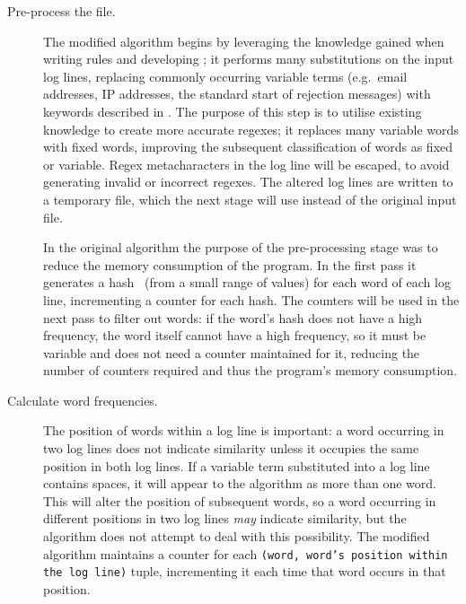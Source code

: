 \begin{description}

    \item [Pre-process the file.]  The modified algorithm begins by
        leveraging the knowledge gained when writing rules and developing
        \parsername{}; it performs many substitutions on the input log
        lines, replacing commonly occurring variable terms (e.g.\ email
        addresses, IP addresses, the standard start of rejection messages)
        with keywords described in .  The
        purpose of this step is to utilise existing knowledge to create
        more accurate regexes; it replaces many variable words with fixed
        words, improving the subsequent classification of words as fixed or
        variable.  Regex metacharacters in the log line will be escaped, to
        avoid generating invalid or incorrect regexes.  The altered log
        lines are written to a temporary file, which the next stage will
        use instead of the original input file.

        In the original algorithm the purpose of the pre-processing stage
        was to reduce the memory consumption of the program.  In the first
        pass it generates a hash~\cite{hash-functions} (from a
        small range of values) for each word of each log line, incrementing
        a counter for each hash.  The counters will be used in the next
        pass to filter out words: if the word's hash does not have a high
        frequency, the word itself cannot have a high frequency, so it must
        be variable and does not need a counter maintained for it, reducing
        the number of counters required and thus the program's memory
        consumption.

    \item [Calculate word frequencies.]  The position of words within a log
        line is important: a word occurring in two log lines does not
        indicate similarity unless it occupies the same position in both
        log lines.  If a variable term substituted into a log line contains
        spaces, it will appear to the algorithm as more than one word.
        This will alter the position of subsequent words, so a word
        occurring in different positions in two log lines \textit{may\/}
        indicate similarity, but the algorithm does not attempt to deal
        with this possibility.  The modified algorithm maintains a counter
        for each \texttt{(word, word's position within the log line)}
        tuple, incrementing it each time that word occurs in that position.


\end{description}
